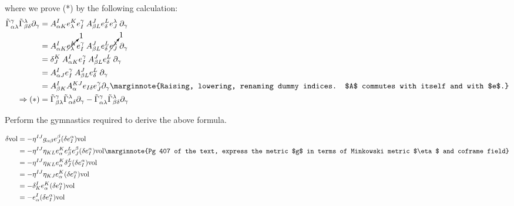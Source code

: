 \documentclass[10pt]{article}
\begin{document}
where we prove (*) by the following calculation:
$$
\begin{aligned}
	\tilde{\Gamma}_{\alpha\lambda}^\gamma \tilde{\Gamma}_{\beta\delta}^\lambda \partial_\gamma &= A_{\alpha K}^Ie_\lambda^Ke_I^\gamma \:A_{\beta L}^Je_\delta^Le_J^\lambda \:\partial_\gamma\\
	&= A_{\alpha K}^I\cancelto{1}{e_\lambda^K}e_I^\gamma \:A_{\beta L}^Je_\delta^L\cancelto{1}{e_J^\lambda} \:\partial_\gamma\\
	&= \delta_J^K\:A_{\alpha K}^Ie_I^\gamma \:A_{\beta L}^Je_\delta^L \:\partial_\gamma\\
	&= A_{\alpha J}^Ie_I^\gamma \:A_{\beta L}^Je_\delta^L \:\partial_\gamma\\
	&= A_{\beta K}^{I}A_{\alpha}^{KJ}e_{I\delta} e_J^\gamma \partial_\gamma\marginnote{Raising, lowering, renaming dummy indices. $A$ commutes with itself and with $e$.}\\
	\Rightarrow (*) &= \tilde{\Gamma}_{\beta\lambda}^\gamma \tilde{\Gamma}_{\alpha\delta}^\lambda \partial_\gamma - \tilde{\Gamma}_{\alpha\lambda}^\gamma \tilde{\Gamma}_{\beta\delta}^\lambda \partial_\gamma
\end{aligned}
$$


\begin{example}
	Perform the gymnastics required to derive the above formula.
\end{example}
\sol $$
\begin{aligned}
	\delta\vol &= -\eta^{IJ} g_{\alpha\beta} e_J^\beta (\delta e_I^\alpha)\vol\\
	&= -\eta^{IJ}\eta_{KL} e_\alpha^K e_\beta^L e_J^\beta (\delta e_I^\alpha)\vol\marginnote{Pg 407 of the text, express the metric $g$ in terms of Minkowski metric $\eta$ and coframe field}\\
	&= -\eta^{IJ}\eta_{KL} e_\alpha^K \delta_J^L (\delta e_I^\alpha)\vol\\
	&= -\eta^{IJ}\eta_{KJ} e_\alpha^K (\delta e_I^\alpha)\vol\\
	&= -\delta_K^I e_\alpha^K (\delta e_I^\alpha)\vol\\
	&= -e_\alpha^I (\delta e_I^\alpha)\vol\\
\end{aligned}
$$
\end{document}
